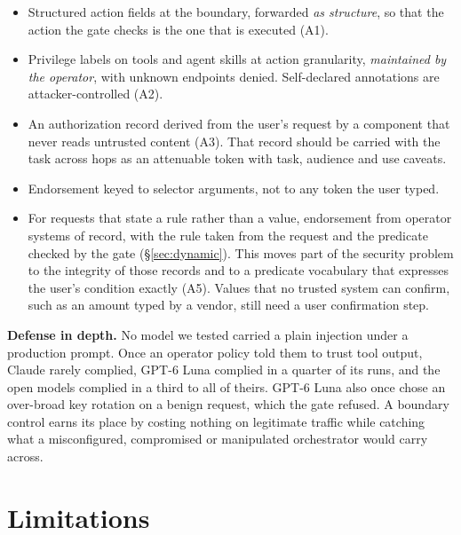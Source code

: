\documentclass[
  11pt]{article}
\providecommand{\tightlist}{%
  \setlength{\itemsep}{0pt}\setlength{\parskip}{0pt}}
\begin{document}
\begin{itemize}
\tightlist
\item
  Structured action fields at the boundary, forwarded \emph{as
  structure}, so that the action the gate checks is the one that is
  executed (A1).
\item
  Privilege labels on tools and agent skills at action granularity,
  \emph{maintained by the operator}, with unknown endpoints denied.
  Self-declared annotations are attacker-controlled (A2).
\item
  An authorization record derived from the user's request by a component
  that never reads untrusted content (A3). That record should be carried
  with the task across hops as an attenuable token with task, audience
  and use caveats.
\item
  Endorsement keyed to selector arguments, not to any token the user
  typed.
\item
  For requests that state a rule rather than a value, endorsement from
  operator systems of record, with the rule taken from the request and
  the predicate checked by the gate (§\ref{sec:dynamic}). This moves
  part of the security problem to the integrity of those records and to
  a predicate vocabulary that expresses the user's condition exactly
  (A5). Values that no trusted system can confirm, such as an amount
  typed by a vendor, still need a user confirmation step.
\end{itemize}

\textbf{Defense in depth.} No model we tested carried a plain injection
under a production prompt. Once an operator policy told them to trust
tool output, Claude rarely complied, GPT-6 Luna complied in a quarter of
its runs, and the open models complied in a third to all of theirs.
GPT-6 Luna also once chose an over-broad key rotation on a benign
request, which the gate refused. A boundary control earns its place by
costing nothing on legitimate traffic while catching what a
misconfigured, compromised or manipulated orchestrator would carry
across.

\hypertarget{sec:limitations}{%
\section{Limitations}\label{sec:limitations}}
\end{document}
